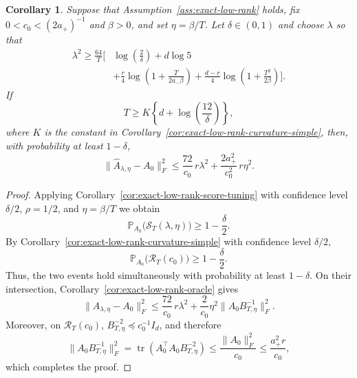 \documentclass[11pt]{article}
\newtheorem{corollary}[theorem]{Corollary}
\begin{document}
\begin{corollary}%
\label{cor:exact-low-rank-rate}
Suppose that Assumption~\ref{ass:exact-low-rank} holds, fix
$0<c_0<(2a_+)^{-1}$ and $\beta>0$, and set $\eta=\beta/T$. Let
$\delta\in(0,1)$ and choose $\lambda$ so that
\begin{equation}
\begin{aligned}
    \lambda^2
    \geq
    \frac{64}{T}
    \Bigg[
        &\log\!\left(\frac{2}{\delta}\right)
        +d\log 5 \\
        &+\frac r4\log\!\left(1+\frac{T}{2a_-\beta}\right)
        +\frac{d-r}{4}\log\!\left(1+\frac{T^2}{2\beta}\right)
    \Bigg].
\end{aligned}
\label{eq:exact-low-rank-rate-tuning}
\end{equation}
If
\[
    T\geq K\left\{d+\log\!\left(\frac{12}{\delta}\right)\right\},
\]
where $K$ is the constant in
Corollary~\ref{cor:exact-low-rank-curvature-simple}, then, with probability at
least $1-\delta$,
\begin{equation}
    \big\|\widehat A_{\lambda,\eta}-A_0\big\|_F^2
    \leq
    \frac{72}{c_0}\,r\lambda^2
    +\frac{2a_+^2}{c_0^2}\,r\eta^2.
\label{eq:exact-low-rank-rate-bound}
\end{equation}

\end{corollary}




\begin{proof}
Applying Corollary~\ref{cor:exact-low-rank-score-tuning} with confidence level
$\delta/2$, $\rho=1/2$, and $\eta=\beta/T$ we obtain
\[
    \mathbb P_{A_0}\bigl(\mathcal S_T(\lambda,\eta)\bigr)
    \geq1-\frac{\delta}{2}.
\]
By Corollary~\ref{cor:exact-low-rank-curvature-simple} with confidence level
$\delta/2$,
\[
    \mathbb P_{A_0}\bigl(\mathcal R_T(c_0)\bigr)
    \geq1-\frac{\delta}{2}.
\]
Thus, the two events hold simultaneously with probability at least $1-\delta$.
On their intersection, Corollary~\ref{cor:exact-low-rank-oracle} gives
\[
    \big\|\widehat A_{\lambda,\eta}-A_0\big\|_F^2
    \leq
    \frac{72}{c_0}\,r\lambda^2
    +\frac{2}{c_0}\eta^2\big\|A_0B_{T,\eta}^{-1}\big\|_F^2.
\]
Moreover, on $\mathcal R_T(c_0)$,
$B_{T,\eta}^{-2}\preceq c_0^{-1}I_d$, and therefore
\[
    \big\|A_0B_{T,\eta}^{-1}\big\|_F^2
    =\operatorname{tr}\!\left(A_0^\top A_0B_{T,\eta}^{-2}\right)
    \leq\frac{\|A_0\|_F^2}{c_0}
    \leq\frac{a_+^2r}{c_0},
\]
which completes the proof.
\end{proof}
\end{document}

